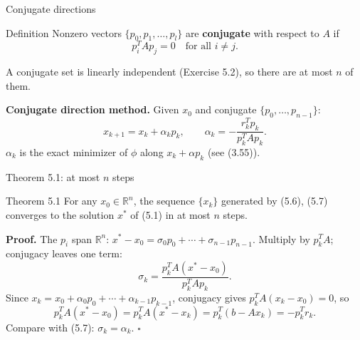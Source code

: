 \documentclass[12pt,aspectratio=169]{beamer}
\newcommand{\R}{\mathbb{R}}
\begin{document}
\begin{frame}{Conjugate directions}
  \begin{block}{Definition}
    Nonzero vectors $\{p_0,p_1,\dots,p_l\}$ are \textbf{conjugate} with respect to $A$ if
    \begin{equation}
      p_i^TAp_j = 0 \quad\text{for all } i\neq j. \tag{5.5}
    \end{equation}
  \end{block}
  A conjugate set is linearly independent (Exercise 5.2), so there are at most $n$ of them.

  \textbf{Conjugate direction method.} Given $x_0$ and conjugate $\{p_0,\dots,p_{n-1}\}$:
  \begin{equation}
    x_{k+1} = x_k+\alpha_kp_k, \qquad \alpha_k = -\frac{r_k^Tp_k}{p_k^TAp_k}. \tag{5.6, 5.7}
  \end{equation}
  $\alpha_k$ is the exact minimizer of $\phi$ along $x_k+\alpha p_k$ (see (3.55)).
\end{frame}

\begin{frame}{Theorem 5.1: at most $n$ steps}
  \begin{block}{Theorem 5.1}
    For any $x_0\in\R^n$, the sequence $\{x_k\}$ generated by (5.6), (5.7) converges to the solution $x^*$ of (5.1) in at most $n$ steps.
  \end{block}
  \textbf{Proof.} The $p_i$ span $\R^n$: $x^*-x_0=\sigma_0p_0+\cdots+\sigma_{n-1}p_{n-1}$.
  Multiply by $p_k^TA$; conjugacy leaves one term:
  \begin{equation}
    \sigma_k = \frac{p_k^TA(x^*-x_0)}{p_k^TAp_k}. \tag{5.8}
  \end{equation}
  Since $x_k = x_0+\alpha_0p_0+\cdots+\alpha_{k-1}p_{k-1}$, conjugacy gives $p_k^TA(x_k-x_0)=0$, so
  \[
    p_k^TA(x^*-x_0) = p_k^TA(x^*-x_k) = p_k^T(b-Ax_k) = -p_k^Tr_k.
  \]
  Compare with (5.7): $\sigma_k=\alpha_k$. \hfill$\square$
\end{frame}
\end{document}
